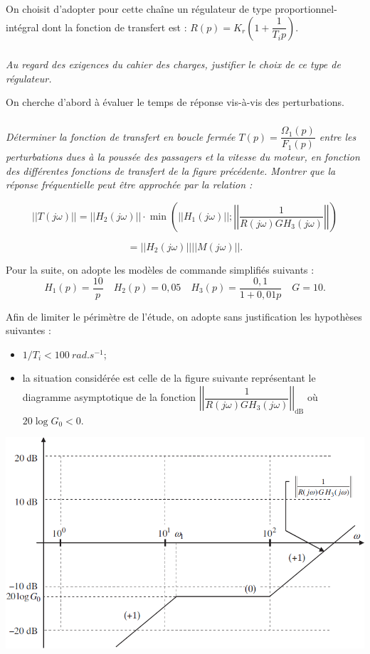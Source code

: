 \documentclass[10pt,fleqn]{article} %
\begin{document}
\begin{multicols}{2}
On choisit d’adopter pour cette chaîne un régulateur de type proportionnel-intégral
dont la fonction de transfert est : $R(p)=K_r\left(1+\dfrac{1}{T_i p}  \right)$.

\subparagraph{}\textit{Au regard des exigences du cahier des charges, justifier le choix
de ce type de régulateur.}

On cherche d'abord à évaluer le temps de réponse vis-à-vis des perturbations. 

\subparagraph{}\textit{Déterminer la fonction de transfert en boucle fermée $T(p)=\dfrac{\Omega_1(p)}{F_1(p)}$ entre les perturbations dues à la poussée des passagers et la vitesse du moteur, en fonction des différentes fonctions de transfert de la figure précédente.  Montrer que la réponse fréquentielle peut être approchée par la relation :}

$$
|| T\left(j \omega\right) || = 
|| H_2\left(j \omega\right) || \cdot 
\min \left(
||H_1\left(j \omega\right)||; 
\left|\left| \dfrac{1}{R\left(j \omega\right)GH_3\left(j \omega\right)}\right|\right|\right)
$$

$$
= || H_2\left(j \omega\right) || || M\left(j \omega\right) ||.
$$


Pour la suite, on adopte les modèles de commande simplifiés suivants : 
$$
H_1(p)=\dfrac{10}{p} \quad
H_2(p)=0,05 \quad
H_3(p)=\dfrac{0,1}{1+0,01 p}\quad
G=10.
$$

Afin de limiter le périmètre de l’étude, on adopte sans justification les
hypothèses suivantes : 
\begin{itemize}
\item $1/T_i < \SI{100}{rad.s^{-1}}$;
\item la situation considérée est celle de la figure suivante représentant le diagramme asymptotique de la fonction 
$
\left|\left|\dfrac{1}{R\left(j \omega\right)GH_3\left(j \omega\right)}\right|\right|_{\text{dB}}
$ où $20\log G_0 < 0$.
\end{itemize}

\begin{center}
\includegraphics[width=\linewidth]{images/fig_02}
\end{center}


\end{multicols}
\end{document}
